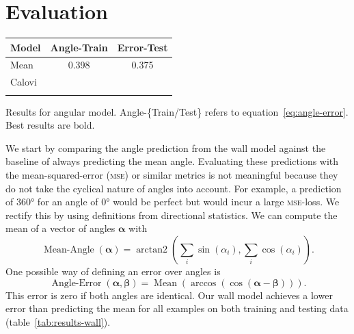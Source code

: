\documentclass[nobib, a4paper]{tufte-handout}
\begin{document}
\section{Evaluation}
\begin{margintable}[5cm]
\centering
\begin{tabular}{@{}lS[table-format=1.3]S[table-format=1.3]@{}}
\toprule
{Model} & {Angle-Train} & {Error-Test} \\ \midrule
Mean & 0.398 & 0.375 \\ 
  Calovi &  & \\ %
\bottomrule\\
\end{tabular}
\caption{Results for angular model.
  Angle-\{Train/Test\} refers to equation~\ref{eq:angle-error}.
  Best results are bold.
}
\label{tab:results-wall}
\end{margintable}
We start by comparing the angle prediction from the wall model against the baseline of always predicting the mean angle.
Evaluating these predictions with the mean-squared-error (\textsc{mse}) or similar metrics is not meaningful because they do not take the cyclical nature of angles into account.
For example, a prediction of \ang{360} for an angle of \ang{0} would be perfect but would incur a large \textsc{mse}-loss.
We rectify this by using definitions from directional statistics\autocite{circularStatistics}.
We can compute the mean of a vector of angles \(\bm{\alpha}\) with
\begin{equation*}
 \operatorname{Mean-Angle}(\bm{\alpha}) = \operatorname{arctan2} \left( \sum_i \sin \left( \alpha_i \right),  \sum_i \cos \left( \alpha_i \right)  \right).
\end{equation*}
One possible way of defining an error over angles is
\begin{equation}\label{eq:angle-error}
 \operatorname{Angle-Error}(\bm{\alpha}, \bm{\beta}) = \operatorname{Mean} \left( \operatorname{arccos} \left(  \cos  (\bm{\alpha} - \bm{\beta})  \right) \right).
\end{equation}
This error is zero if both angles are identical.
Our wall model achieves a lower error than predicting the mean for all examples on both training and testing data (table~\ref{tab:results-wall}).
\end{document}

